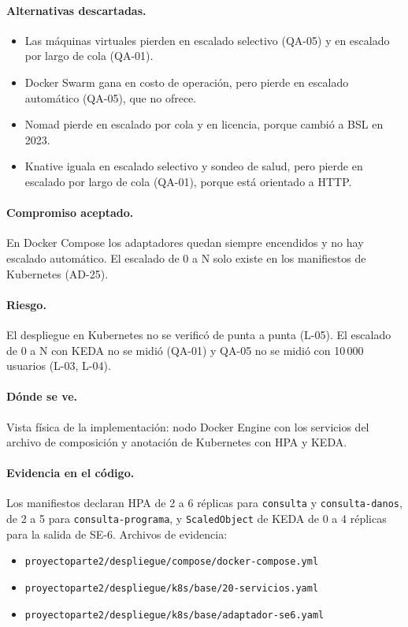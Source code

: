 \paragraph{Alternativas descartadas.}
\begin{itemize}
  \item Las máquinas virtuales pierden en escalado selectivo (QA-05) y en escalado por largo de cola (QA-01).
  \item Docker Swarm gana en costo de operación, pero pierde en escalado automático (QA-05), que no ofrece.
  \item Nomad pierde en escalado por cola y en licencia, porque cambió a BSL en 2023.
  \item Knative iguala en escalado selectivo y sondeo de salud, pero pierde en escalado por largo de cola (QA-01), porque está orientado a HTTP.
\end{itemize}

\paragraph{Compromiso aceptado.} En Docker Compose los adaptadores quedan siempre encendidos y no hay escalado automático.
El escalado de 0 a N solo existe en los manifiestos de Kubernetes (AD-25).

\paragraph{Riesgo.} El despliegue en Kubernetes no se verificó de punta a punta (L-05).
El escalado de 0 a N con KEDA no se midió (QA-01) y QA-05 no se midió con 10\,000 usuarios (L-03, L-04).

\paragraph{Dónde se ve.} Vista física de la implementación: nodo Docker Engine con los servicios del archivo de composición y anotación de Kubernetes con HPA y KEDA.

\paragraph{Evidencia en el código.} Los manifiestos declaran HPA de 2 a 6 réplicas para \texttt{consulta} y \texttt{consulta-\br{}danos}, de 2 a 5 para \texttt{consulta-\br{}programa}, y \texttt{ScaledObject} de KEDA de 0 a 4 réplicas para la salida de SE-6.
Archivos de evidencia:
{\raggedright
\begin{itemize}
  \item \texttt{proyectoparte2/\br{}despliegue/\br{}compose/\br{}docker-compose.yml}
  \item \texttt{proyectoparte2/\br{}despliegue/\br{}k8s/\br{}base/\br{}20-servicios.yaml}
  \item \texttt{proyectoparte2/\br{}despliegue/\br{}k8s/\br{}base/\br{}adaptador-se6.yaml}
\end{itemize}
\par}

